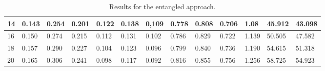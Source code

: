 \begin{table}[]
\begin{tabular}{|l | lll| lll |lll |lll|}
		14 & 0.143   & 0.254   & 0.201  & 0.122    & 0.138    & 0,109   &  0.778     & 0.808    & 0.706    & 1.08     & 45.912     & 43.098     \\ \hline
		16 & 0.150   & 0.274   & 0.215  &  0.112    & 0.131    & 0.102   & 0.786    & 0.829    & 0.722    & 1.139     & 50.505     & 47.582     \\ \hline
		18 & 0.157   & 0.290   & 0.227  & 0.104   & 0.123    & 0.096   & 0.799     & 0.840    & 0.736    & 1.190     & 54.615     & 51.318     \\ \hline
		20 & 0.165   & 0.306   & 0.241  & 0.098    & 0.117    & 0.092   & 0.816     & 0.855    & 0.756    & 1.256     & 58.725     & 54.923    \\ \hline
	\end{tabular}
\caption{Results for the entangled approach.}
\label{tab:combined}
\end{table}




